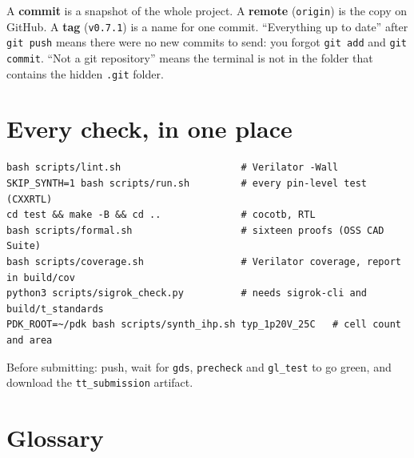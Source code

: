 \documentclass[11pt,a4paper]{article}
\newcommand{\file}[1]{\texttt{#1}}
\newcommand{\cmd}[1]{\texttt{#1}}
\begin{document}
A \textbf{commit} is a snapshot of the whole project. A \textbf{remote} (\texttt{origin}) is the copy on GitHub. A \textbf{tag} (\texttt{v0.7.1}) is a name for one commit. ``Everything up to date'' after \cmd{git push} means there were no new commits to send: you forgot \cmd{git add} and \cmd{git commit}. ``Not a git repository'' means the terminal is not in the folder that contains the hidden \file{.git} folder.

\section{Every check, in one place}

\begin{lstlisting}
bash scripts/lint.sh                     # Verilator -Wall
SKIP_SYNTH=1 bash scripts/run.sh         # every pin-level test (CXXRTL)
cd test && make -B && cd ..              # cocotb, RTL
bash scripts/formal.sh                   # sixteen proofs (OSS CAD Suite)
bash scripts/coverage.sh                 # Verilator coverage, report in build/cov
python3 scripts/sigrok_check.py          # needs sigrok-cli and build/t_standards
PDK_ROOT=~/pdk bash scripts/synth_ihp.sh typ_1p20V_25C   # cell count and area
\end{lstlisting}

Before submitting: push, wait for \cmd{gds}, \texttt{precheck} and \texttt{gl\_test} to go green, and download the \texttt{tt\_submission} artifact.

\section*{Glossary}
\end{document}
